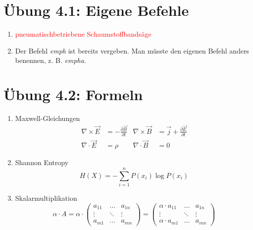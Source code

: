 \documentclass{article}
\newcommand\pbsb[1]{\textcolor{#1}{pneumatischbetriebene Schaumstoffbandsäge}}
\begin{document}
\section*{Übung 4.1: Eigene Befehle}
\begin{enumerate}[label=\alph*)]
    \item \pbsb{red}
    \item Der Befehl \emph{emph} ist bereits vergeben.
          Man müsste den eigenen Befehl anders benennen, z. B. \emph{empha}.
\end{enumerate}

\section*{Übung 4.2: Formeln}
\begin{enumerate}[label=\alph*)]
    \item Maxwell-Gleichungen
          \begin{align}
              \nabla \times \vec{E} & = - \frac{\partial \vec{B}}{\partial t}         &
              \nabla \times \vec{B} & = \vec{j} + \frac{\partial \vec{E}}{\partial t}   \\
              \nabla \cdot \vec{E}  & = \rho                                          &
              \nabla \cdot \vec{B}  & = 0
          \end{align}

    \item Shannon Entropy
          \begin{displaymath}
              H(X) = - \sum^{n}_{i=1}{P}(x_i) \log P(x_i)
          \end{displaymath}

    \item Skalarmultiplikation
          \begin{displaymath}
              \alpha \cdot A =
              \alpha \cdot \left(
              \begin{matrix}
                  a_{11} & \hdots & a_{1n} \\
                  \vdots & \ddots & \vdots \\
                  a_{m1} & \hdots & a_{mn}
              \end{matrix}
              \right) =
              \left(
              \begin{matrix}
                  \alpha \cdot a_{11} & \hdots & a_{1n} \\
                  \vdots              & \ddots & \vdots \\
                  \alpha \cdot a_{m1} & \hdots & a_{mn}
              \end{matrix}
              \right)
          \end{displaymath}
\end{enumerate}
\end{document}

